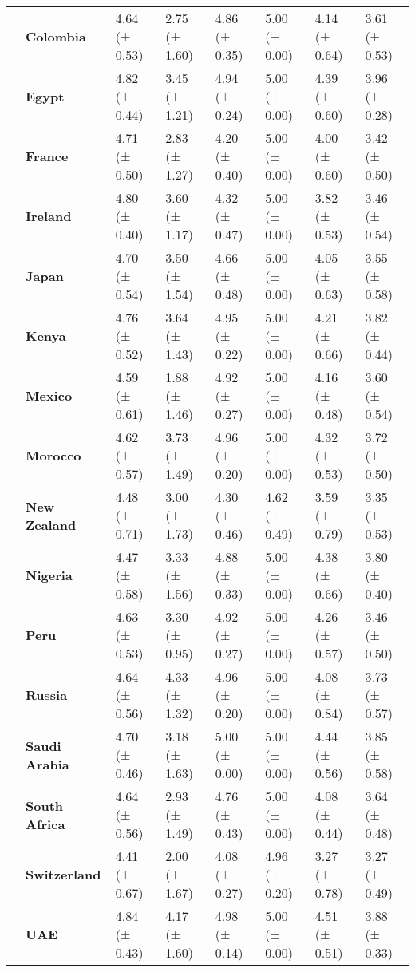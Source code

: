 \begin{longtable}{llllllll}
\textbf{} & \textbf{Colombia} & 4.64 (± 0.53) & 2.75 (± 1.60) & 4.86 (± 0.35) & 5.00 (± 0.00) & 4.14 (± 0.64) & 3.61 (± 0.53) \\
\textbf{} & \textbf{Egypt} & 4.82 (± 0.44) & 3.45 (± 1.21) & 4.94 (± 0.24) & 5.00 (± 0.00) & 4.39 (± 0.60) & 3.96 (± 0.28) \\
\textbf{} & \textbf{France} & 4.71 (± 0.50) & 2.83 (± 1.27) & 4.20 (± 0.40) & 5.00 (± 0.00) & 4.00 (± 0.60) & 3.42 (± 0.50) \\
\textbf{} & \textbf{Ireland} & 4.80 (± 0.40) & 3.60 (± 1.17) & 4.32 (± 0.47) & 5.00 (± 0.00) & 3.82 (± 0.53) & 3.46 (± 0.54) \\
\textbf{} & \textbf{Japan} & 4.70 (± 0.54) & 3.50 (± 1.54) & 4.66 (± 0.48) & 5.00 (± 0.00) & 4.05 (± 0.63) & 3.55 (± 0.58) \\
\textbf{} & \textbf{Kenya} & 4.76 (± 0.52) & 3.64 (± 1.43) & 4.95 (± 0.22) & 5.00 (± 0.00) & 4.21 (± 0.66) & 3.82 (± 0.44) \\
\textbf{} & \textbf{Mexico} & 4.59 (± 0.61) & 1.88 (± 1.46) & 4.92 (± 0.27) & 5.00 (± 0.00) & 4.16 (± 0.48) & 3.60 (± 0.54) \\
\textbf{} & \textbf{Morocco} & 4.62 (± 0.57) & 3.73 (± 1.49) & 4.96 (± 0.20) & 5.00 (± 0.00) & 4.32 (± 0.53) & 3.72 (± 0.50) \\
\textbf{} & \textbf{New Zealand} & 4.48 (± 0.71) & 3.00 (± 1.73) & 4.30 (± 0.46) & 4.62 (± 0.49) & 3.59 (± 0.79) & 3.35 (± 0.53) \\
\textbf{} & \textbf{Nigeria} & 4.47 (± 0.58) & 3.33 (± 1.56) & 4.88 (± 0.33) & 5.00 (± 0.00) & 4.38 (± 0.66) & 3.80 (± 0.40) \\
\textbf{} & \textbf{Peru} & 4.63 (± 0.53) & 3.30 (± 0.95) & 4.92 (± 0.27) & 5.00 (± 0.00) & 4.26 (± 0.57) & 3.46 (± 0.50) \\
\textbf{} & \textbf{Russia} & 4.64 (± 0.56) & 4.33 (± 1.32) & 4.96 (± 0.20) & 5.00 (± 0.00) & 4.08 (± 0.84) & 3.73 (± 0.57) \\
\textbf{} & \textbf{Saudi Arabia} & 4.70 (± 0.46) & 3.18 (± 1.63) & 5.00 (± 0.00) & 5.00 (± 0.00) & 4.44 (± 0.56) & 3.85 (± 0.58) \\
\textbf{} & \textbf{South Africa} & 4.64 (± 0.56) & 2.93 (± 1.49) & 4.76 (± 0.43) & 5.00 (± 0.00) & 4.08 (± 0.44) & 3.64 (± 0.48) \\
\textbf{} & \textbf{Switzerland} & 4.41 (± 0.67) & 2.00 (± 1.67) & 4.08 (± 0.27) & 4.96 (± 0.20) & 3.27 (± 0.78) & 3.27 (± 0.49) \\
\textbf{} & \textbf{UAE} & 4.84 (± 0.43) & 4.17 (± 1.60) & 4.98 (± 0.14) & 5.00 (± 0.00) & 4.51 (± 0.51) & 3.88 (± 0.33) \\

\end{longtable}

